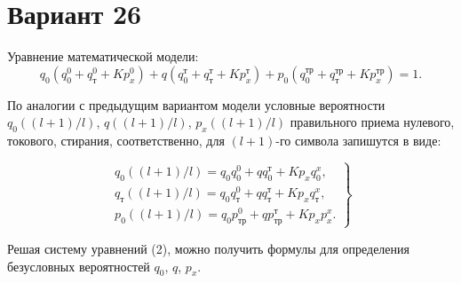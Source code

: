 \documentclass{article}
\begin{document}
\section*{Вариант 26}
Уравнение математической модели:
\begin{equation}
q_0 \left( q_0^0 + q_{\text{т}}^0 + K p_x^0 \right) + q \left( q_0^{\text{т}} + q_{\text{т}}^{\text{т}} + K p_x^{\text{т}} \right) + p_0 \left( q_0^{\text{тр}} + q_{\text{т}}^{\text{тр}} + K p_x^{\text{тр}} \right) = 1.  
\end{equation}

По аналогии с предыдущим вариантом модели условные вероятности $q_0((l+1)/l)$, $q((l+1)/l)$, $p_x((l+1)/l)$ правильного приема нулевого, токового, стирания, соответственно, для $(l+1)$-го символа запишутся в виде:

\begin{equation}
    \left.
    \begin{array}{ll}
        q_0((l+1)/l) = q_0 q_0^0 + q q_0^{\text{т}} + K p_x q_0^x, \\ [4pt]
        q_{\text{т}}((l+1)/l) = q_0 q_{\text{т}}^0 + q q_{\text{т}}^{\text{т}} + K p_x q_{\text{т}}^x, \\ [4pt]
        p_0((l+1)/l) = q_0 p_{\text{тр}}^0 + q p_{\text{тр}}^{\text{т}} + K p_x p_x^x.
    \end{array}
  \right\}
\end{equation} 

\noindent Решая систему уравнений (2), можно получить формулы для определения безусловных вероятностей $q_0$, $q$, $p_x$.
\end{document}
